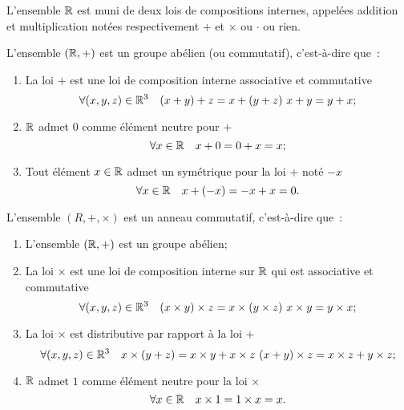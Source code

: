 L'ensemble \(\mathbb{R}\) est muni de deux lois de compositions internes, appelées addition et multiplication notées respectivement \(+\) et \(\times\) ou \(\cdot\) ou rien.
\begin{prop}
  L'ensemble \((\mathbb{R},+)\) est un groupe abélien (ou commutatif), c'est-à-dire que~:
  \begin{enumerate}
  \item La loi \(+\) est une loi de composition interne associative et commutative
    \begin{equation}
      \forall (x,y,z) \in \R^3 \quad (x+y)+z=x+(y+z) \ x+y=y+x;
    \end{equation}
  \item \(\mathbb{R}\) admet \(0\) comme élément neutre pour \(+\)
    \begin{equation}
      \forall x \in \mathbb{R} \quad x+0=0+x=x;
    \end{equation}
  \item Tout élément \(x\in\mathbb{R}\) admet un symétrique pour la loi \(+\) noté \(-x\)
    \begin{equation}
      \forall x \in \mathbb{R} \quad x+(-x)=-x+x=0.
    \end{equation}
  \end{enumerate}
\end{prop}
\begin{prop}
  L'ensemble \((R,+,\times)\) est un anneau commutatif, c'est-à-dire que~:
  \begin{enumerate}
  \item L'ensemble \((\mathbb{R},+)\) est un groupe abélien;
  \item La loi \(\times\) est une loi de composition interne sur \(\mathbb{R}\) qui est associative et commutative
    \begin{equation}
      \forall (x,y,z) \in \mathbb{R}^3 \quad (x\times y)\times z=x\times (y\times z) \ x\times y=y\times x;
    \end{equation}
  \item La loi \(\times\) est distributive par rapport à la loi \(+\)
    \begin{equation}
      \forall (x,y,z) \in \mathbb{R}^3 \quad x\times(y+z)=x\times y+x\times z \ (x+y)\times z=x\times z+y\times z;
    \end{equation}
  \item \(\mathbb{R}\) admet \(1\) comme élément neutre pour la loi \(\times\)
    \begin{equation}
      \forall x \in \mathbb{R} \quad x\times 1=1\times x=x.
    \end{equation}
  \end{enumerate}
\end{prop}
